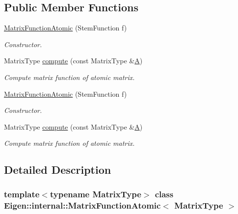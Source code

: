 \subsection*{Public Member Functions}
\begin{DoxyCompactItemize}
\item 
\hyperlink{class_eigen_1_1internal_1_1_matrix_function_atomic_a0786bb0349fe5ca5f8df13db7e21e882}{Matrix\+Function\+Atomic} (Stem\+Function f)
\begin{DoxyCompactList}\small\item\em Constructor. \end{DoxyCompactList}\item 
Matrix\+Type \hyperlink{class_eigen_1_1internal_1_1_matrix_function_atomic_a704ccdc87d66cb6f93d16e0a0b9e8acf}{compute} (const Matrix\+Type \&\hyperlink{group___core___module_class_eigen_1_1_matrix}{A})
\begin{DoxyCompactList}\small\item\em Compute matrix function of atomic matrix. \end{DoxyCompactList}\item 
\hyperlink{class_eigen_1_1internal_1_1_matrix_function_atomic_a0786bb0349fe5ca5f8df13db7e21e882}{Matrix\+Function\+Atomic} (Stem\+Function f)
\begin{DoxyCompactList}\small\item\em Constructor. \end{DoxyCompactList}\item 
Matrix\+Type \hyperlink{class_eigen_1_1internal_1_1_matrix_function_atomic_a704ccdc87d66cb6f93d16e0a0b9e8acf}{compute} (const Matrix\+Type \&\hyperlink{group___core___module_class_eigen_1_1_matrix}{A})
\begin{DoxyCompactList}\small\item\em Compute matrix function of atomic matrix. \end{DoxyCompactList}\end{DoxyCompactItemize}


\subsection{Detailed Description}
\subsubsection*{template$<$typename Matrix\+Type$>$\newline
class Eigen\+::internal\+::\+Matrix\+Function\+Atomic$<$ Matrix\+Type $>$}

